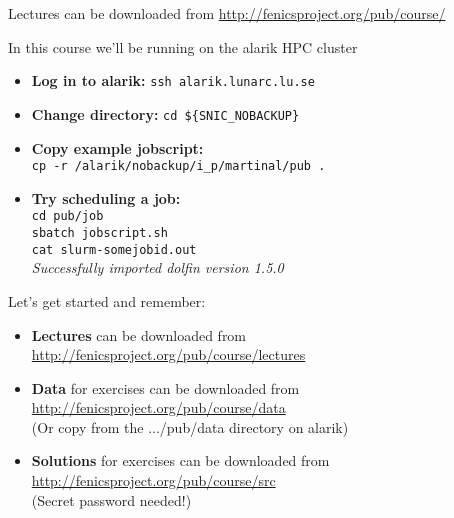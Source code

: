 \documentclass{fenicscourse}
\begin{document}
\begin{frame}
  \normalsize

  {\footnotesize Lectures can be downloaded from
    \url{http://fenicsproject.org/pub/course/}}

\end{frame}

















\begin{frame}{In this course we'll be running on the alarik HPC cluster}
\begin{itemize}
\item \textbf{Log in to alarik:} \texttt{ssh alarik.lunarc.lu.se}
\item \textbf{Change directory:} \texttt{cd \$\{SNIC\_NOBACKUP\}}
\item \textbf{Copy example jobscript:}\\
\texttt{cp -r /alarik/nobackup/i\_p/martinal/pub .}
\item \textbf{Try scheduling a job:}\\
\texttt{cd pub/job}\\
\texttt{sbatch jobscript.sh}\\
\texttt{cat slurm-somejobid.out}\\
\emph{Successfully imported dolfin version 1.5.0}
\end{itemize}
\end{frame}


\begin{frame}{Let's get started and remember:}

\linespread{2.0}
\bigskip
\begin{itemize}
\item
{\footnotesize \textbf{Lectures} can be downloaded from
  \url{http://fenicsproject.org/pub/course/lectures}}

\item
{\footnotesize \textbf{Data} for exercises can be downloaded from
  \url{http://fenicsproject.org/pub/course/data} \\
(Or copy from the .../pub/data directory on alarik)}

\item
{\footnotesize \textbf{Solutions} for exercises can be downloaded from
  \url{http://fenicsproject.org/pub/course/src} \\
(Secret password needed!)
}
\end{itemize}
\linespread{1.0}\

\end{frame}
\end{document}
